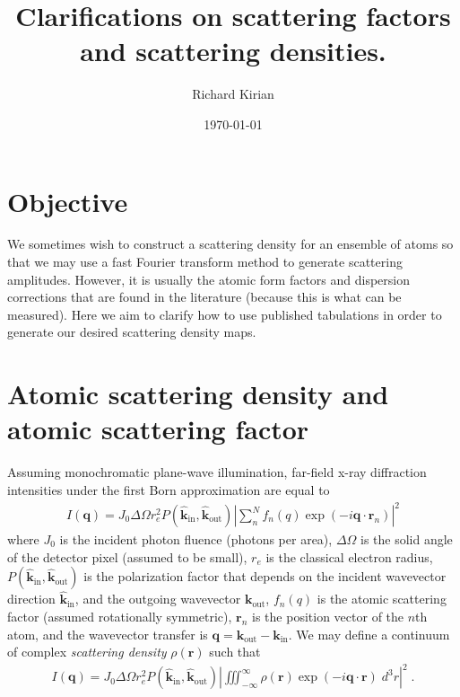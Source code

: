 \documentclass[11pt]{article}
\title{Clarifications on scattering factors and scattering densities.}
\author{Richard Kirian}
\date{\today}
\renewcommand{\vec}[1]{\boldsymbol{#1}}
\newcommand{\hvec}[1]{\hat{\vec{#1}}}
\begin{document}
 

\maketitle

\section{Objective}

We sometimes wish to construct a scattering density for an ensemble of atoms so that we may use a fast Fourier transform method to generate scattering amplitudes.  However, it is usually the atomic form factors and dispersion corrections that are found in the literature (because this is what can be measured).  Here we aim to clarify how to use published tabulations in order to generate our desired scattering density maps.

\section{Atomic scattering density and atomic scattering factor}

Assuming monochromatic plane-wave illumination, far-field x-ray diffraction intensities under the first Born approximation are equal to 
\begin{align}\label{eqn:qrf}
I(\vec{q}) = J_0 \Delta \Omega r_e^2 P(\hvec{k}_\text{in}, \hvec{k}_\text{out}) \left| \sum_n^N f_n(q) \exp(-i \vec{q}\cdot\vec{r}_n)\right|^2
\end{align}
where $J_0$ is the incident photon fluence (photons per area), $\Delta \Omega$ is the solid angle of the detector pixel (assumed to be small), $r_e$ is the classical electron radius, $P(\hvec{k}_\text{in}, \hvec{k}_\text{out})$ is the polarization factor that depends on the incident wavevector direction $\hvec{k}_\text{in}$, and the outgoing wavevector $\vec{k}_\text{out}$, $f_n(q)$ is the atomic scattering factor (assumed rotationally symmetric), $\vec{r}_n$ is the position vector of the $n$th atom, and the wavevector transfer is $\vec{q} = \vec{k}_\text{out}-\vec{k}_\text{in}$.  We may define a continuum of complex \emph{scattering density} $\rho(\vec{r})$ such that
\begin{align}\label{eqn:dft}
I(\vec{q}) = J_0 \Delta \Omega r_e^2 P(\hvec{k}_\text{in}, \hvec{k}_\text{out}) \left| \iiint_{-\infty}^\infty \rho(\vec{r}) \exp(-i \vec{q}\cdot\vec{r}) \; d^3r\right|^2 \; .
\end{align}
\end{document}
